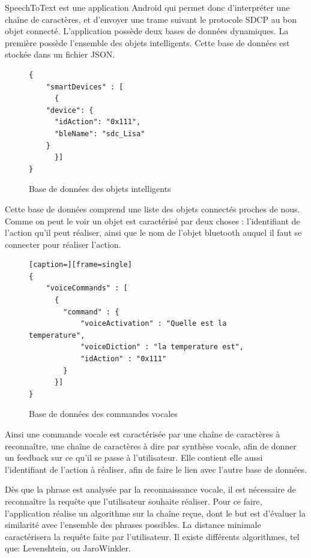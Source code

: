 SpeechToText est une application Android qui permet donc d'interpréter une chaîne de caractères, et d'envoyer une trame suivant le protocole SDCP au bon objet connecté. L'application possède deux bases de données dynamiques. La première possède l'ensemble des objets intelligents. Cette base de données est stockée dans un fichier JSON.

\begin{figure}[!ht]
         \centering
         	\begin{lstlisting}
{
    "smartDevices" : [
      {
	"device": {
	  "idAction": "0x111",
	  "bleName": "sdc_Lisa"
	}
      }]
}
		\end{lstlisting}
         \caption{Base de données des objets intelligents}
         \label{BDD_smart}
\end{figure}


Cette base de données comprend une liste des objets connectés proches de nous. Comme on peut le voir un objet est caractérisé par deux choses : l'identifiant de l'action qu'il peut réaliser, ainsi que le nom de l'objet bluetooth auquel il faut se connecter pour réaliser l'action.

\begin{figure}[!ht]
         \centering
	 \begin{lstlisting}[caption=][frame=single]
{
    "voiceCommands" : [
      {
        "command" : {
            "voiceActivation" : "Quelle est la temperature",
            "voiceDiction" : "la temperature est",
            "idAction" : "0x111"
        }
      }]
}
	 \end{lstlisting}
         \caption{Base de données des commandes vocales}
         \label{BDD_objects}
\end{figure}



Ainsi une commande vocale est caractérisée par une chaîne de caractères à reconnaître, une chaîne de caractères à dire par synthèse vocale, afin de donner un feedback sur ce qu'il se passe à l'utilisateur. Elle contient elle aussi l'identifiant de l'action à réaliser, afin de faire le lien avec l'autre base de données.

Dès que la phrase est analysée par la reconnaissance vocale, il est nécessaire de reconnaître la requête que l'utilisateur souhaite réaliser. Pour ce faire, l'application réalise un algorithme sur la chaîne reçue, dont le but est d'évaluer la similarité avec l'ensemble des phrases possibles. La distance minimale caractérisera la requête faite par l'utilisateur. Il existe différents algorithmes, tel que: Levenshtein, ou JaroWinkler.

